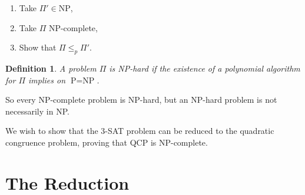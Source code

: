 \documentclass{amsart}
\theoremstyle{plain}
\newcounter{dummy-def}\numberwithin{dummy-def}{section}
\newtheorem{definition}[dummy-def]{Definition}
\newcounter{dummy-thm}\numberwithin{dummy-thm}{section}
\newcounter{dummy-prop}\numberwithin{dummy-prop}{section}
\newcounter{dummy-corollary}\numberwithin{dummy-corollary}{section}
\newcounter{dummy-lemma}\numberwithin{dummy-lemma}{section}
\newcounter{dummy-ex}\numberwithin{dummy-ex}{section}
\newcounter{dummy-eg}\numberwithin{dummy-eg}{section}
\numberwithin{equation}{section}
\newcommand{\p}{\text{P}}
\newcommand{\np}{\text{NP}}
\begin{document}
\begin{enumerate}
  \item Take $\Pi'\in \np$,
  \item Take $\Pi$ NP-complete,
  \item Show that $\Pi\leq_p\Pi'$.
\end{enumerate}

\begin{definition} A problem $\Pi$ is NP-hard if the existence of a polynomial algorithm for $\Pi$
  implies on $\p=\np$.
\end{definition}

So every NP-complete problem is NP-hard, but an NP-hard problem is not necessarily in NP\@.

We wish to show that the 3-SAT problem can be reduced to the quadratic congruence problem, proving
that QCP is NP-complete.

\section{The Reduction}




\printbibliography[]
\end{document}
